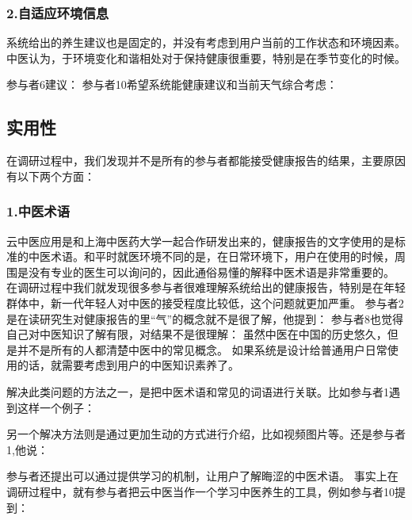 \subsubsection{2.自适应环境信息}

系统给出的养生建议也是固定的，并没有考虑到用户当前的工作状态和环境因素。中医认为，于环境变化和谐相处对于保持健康很重要，特别是在季节变化的时候。

参与者6建议： 
参与者10希望系统能健康建议和当前天气综合考虑：

\subsection{实用性}
在调研过程中，我们发现并不是所有的参与者都能接受健康报告的结果，主要原因有以下两个方面：

\subsubsection{1.中医术语}

云中医应用是和上海中医药大学一起合作研发出来的，健康报告的文字使用的是标准的中医术语。和平时就医环境不同的是，在日常环境下，用户在使用的时候，周围是没有专业的医生可以询问的，因此通俗易懂的解释中医术语是非常重要的。
在调研过程中我们就发现很多参与者很难理解系统给出的健康报告，特别是在年轻群体中，新一代年轻人对中医的接受程度比较低，这个问题就更加严重。
参与者2是在读研究生对健康报告的里“气”的概念就不是很了解，他提到：
参与者8也觉得自己对中医知识了解有限，对结果不是很理解：
虽然中医在中国的历史悠久，但是并不是所有的人都清楚中医中的常见概念。 如果系统是设计给普通用户日常使用的话，就需要考虑到用户的中医知识素养了。

解决此类问题的方法之一，是把中医术语和常见的词语进行关联。比如参与者1遇到这样一个例子：

另一个解决方法则是通过更加生动的方式进行介绍，比如视频图片等。还是参与者1,他说：

参与者还提出可以通过提供学习的机制，让用户了解晦涩的中医术语。
事实上在调研过程中，就有参与者把云中医当作一个学习中医养生的工具，例如参与者10提到：

